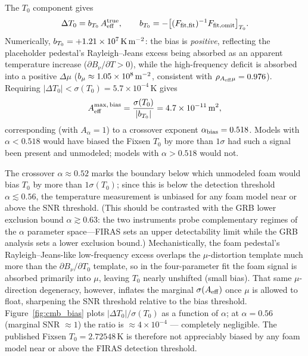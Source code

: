 \documentclass[aps,prd,onecolumn,amsmath,amssymb]{revtex4-2}
\begin{document}
The $T_0$ component gives
\begin{equation}
  \Delta T_0 = b_{T_0}\,A_{\rm eff}^{\rm true},
  \qquad b_{T_0} = -\bigl[(F_{\rm fit,fit})^{-1}F_{\rm fit,omit}\bigr]_{T_0}.
  \label{eq:T0_bias}
\end{equation}
Numerically, $b_{T_0}=+1.21\times10^7\,{\rm K\,m^{-2}}$: the bias is
\emph{positive}, reflecting the placeholder pedestal's Rayleigh--Jeans
excess being absorbed as an apparent temperature increase
($\partial B_\nu/\partial T>0$), while the high-frequency deficit is
absorbed into a positive $\Delta\mu$ ($b_\mu\approx 1.05\times 10^8\,
{\rm m^{-2}}$, consistent with $\rho_{A_{\rm eff}\mu}=0.976$).
Requiring $|\Delta T_0|<\sigma(T_0)=5.7\times 10^{-4}$\,K
\cite{Fixsen2009} gives
\begin{equation}
  A_{\rm eff}^{\rm max,\,bias}
    = \frac{\sigma(T_0)}{|b_{T_0}|} = 4.7\times 10^{-11}\,{\rm m}^2,
  \label{eq:Aeff_bias_bound}
\end{equation}
corresponding (with $A_\alpha=1$) to a crossover exponent
$\alpha_{\rm bias}=0.518$.  Models with $\alpha<0.518$ would have
biased the Fixsen $T_0$ by more than $1\sigma$ had such a signal been
present and unmodeled; models with $\alpha>0.518$ would not.

The crossover $\alpha\approx 0.52$ marks the boundary below which
unmodeled foam would bias $T_0$ by more than $1\sigma(T_0)$; since this
is below the detection threshold $\alpha\lesssim 0.56$, the temperature
measurement is unbiased for any foam model near or above the SNR
threshold.  (This should be contrasted with the GRB lower exclusion
bound $\alpha\gtrsim 0.63$: the two instruments probe complementary
regimes of the $\alpha$ parameter space---FIRAS sets an upper
detectability limit while the GRB analysis sets a lower exclusion
bound.)  Mechanistically, the foam pedestal's Rayleigh--Jeans-like
low-frequency excess overlaps the $\mu$-distortion template much more
than the $\partial B_\nu/\partial T_0$ template, so in the
four-parameter fit the foam signal is absorbed primarily into $\mu$,
leaving $T_0$ nearly unshifted (small bias).  That same $\mu$-direction
degeneracy, however, inflates the marginal $\sigma(A_{\rm eff})$ once
$\mu$ is allowed to float, sharpening the SNR threshold relative to the
bias threshold.
Figure~\ref{fig:cmb_bias} plots $|\Delta T_0|/\sigma(T_0)$ as a
function of $\alpha$; at $\alpha=0.56$ (marginal SNR $\approx 1$) the
ratio is $\approx 4\times 10^{-4}$ --- completely negligible.  The
published Fixsen $T_0=2.72548$\,K is therefore not appreciably biased
by any foam model near or above the FIRAS detection threshold.
\end{document}
